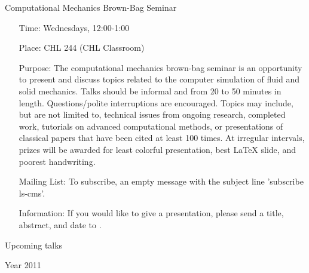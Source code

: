 \documentclass[12]{article}
\begin{document}
\begin{center}
\Large
Computational Mechanics Brown-Bag Seminar
\end{center}

\begin{itemize}
\item[Time:] Wednesdays, 12:00-1:00

\item[Place:] CHL 244 (CHL Classroom)

\item[Purpose:] The computational mechanics brown-bag seminar is an
  opportunity to present and discuss topics related to the computer
  simulation of fluid and solid mechanics. Talks should be informal
  and from 20 to 50 minutes in length. Questions/polite interruptions
  are encouraged. Topics may include, but are not limited to,
  technical issues from ongoing research, completed work, tutorials on
  advanced computational methods, or presentations of classical papers
  that have been cited at least 100 times.  At irregular intervals,
  prizes will be awarded for least colorful presentation, best \LaTeX
  slide, and poorest handwriting.

\item[Mailing List:] To subscribe,  an empty message with the subject line 'subscribe ls-cms'.

\item[Information:] If you would like to give a presentation, please send a title, abstract, and date to .


\end{itemize}


\begin{center}
\Large
Upcoming talks
\end{center}

\begin{center}
\Large
Year 2011
\end{center}
\end{document}
